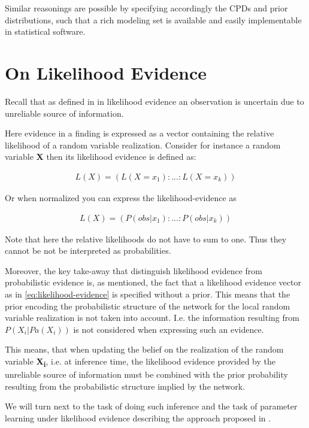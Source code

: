 \documentclass[11pt]{article}
\begin{document}
\begin{article}
Similar reasonings are possible by specifying accordingly the CPDs
and prior distributions, such that a rich modeling set is
available and easily implementable in statistical software.

\section{On Likelihood Evidence}
\label{sec:org6772475}

Recall that as defined in \cite{Mrad_2015} in likelihood evidence an
observation is uncertain due to unreliable source of information.

Here evidence in a finding is expressed as a vector containing the
relative likelihood of a random variable realization. Consider for
instance a random variable \textbf{X} then its likelihood evidence is
defined as:

\begin{align} \label{eq:likelihood-evidence}
 L(X) = (L(X = x_1): ... : L(X = x_k))
\end{align}

Or when normalized you can express the likelihood-evidence as 

\begin{align} \label{eq:normalized-likelihood-evidence}
 L(X) = (P(obs | x_1): ... : P(obs | x_k))
\end{align}

Note that here the relative likelihoods do not have to sum to
one. Thus they cannot be not be interpreted as probabilities.

Moreover, the key take-away that distinguish likelihood evidence
from probabilistic evidence is, as mentioned, the fact that a
likelihood evidence vector as in \ref{eq:likelihood-evidence} is
specified without a prior. This means that the prior encoding the
probabilistic structure of the network for the local random
variable realization is not taken into account. I.e. the
information resulting from \(P(X_i|Pa(X_i))\) is not considered when
expressing such an evidence.

This means, that when updating the belief on the realization of
the random variable \textbf{X\textsubscript{i}}, i.e. at inference time, the likelihood
evidence provided by the unreliable source of information must be
combined with the prior probability resulting from the
probabilistic structure implied by the network.

We will turn next to the task of doing such inference and the task
of parameter learning under likelihood evidence describing the
approach proposed in \cite{Wasserkrug_all}.



\end{article}
\end{document}
